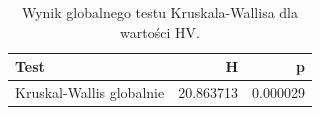 \begin{table}
\caption{Wynik globalnego testu Kruskala-Wallisa dla wartości HV.}
\label{tab:kruskal_global}
\begin{tabular}{lrr}
\toprule
Test & H & p \\
\midrule
Kruskal-Wallis globalnie & 20.863713 & 0.000029 \\
\bottomrule
\end{tabular}
\end{table}
